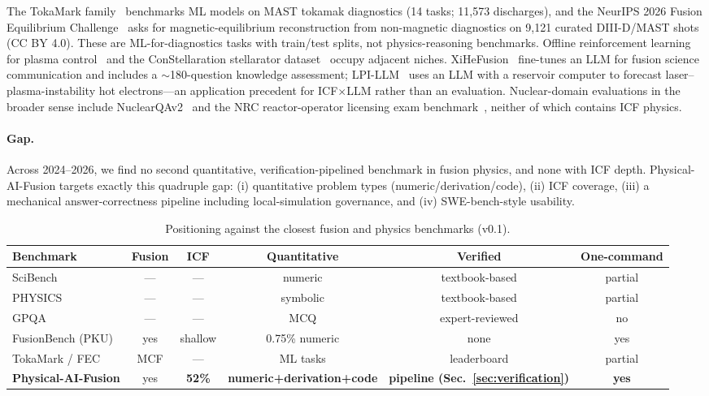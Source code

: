 The TokaMark family~\cite{ibm2026tokamark,gupta2026tokamark} benchmarks ML models on MAST tokamak diagnostics (14 tasks; 11{,}573 discharges), and the NeurIPS 2026 Fusion Equilibrium Challenge~\cite{sophelio2026fec} asks for magnetic-equilibrium reconstruction from non-magnetic diagnostics on 9{,}121 curated DIII-D/MAST shots (CC BY 4.0). These are ML-for-diagnostics tasks with train/test splits, not physics-reasoning benchmarks. Offline reinforcement learning for plasma control~\cite{offlinerl2026fusion} and the ConStellaration stellarator dataset~\cite{constellaration} occupy adjacent niches. XiHeFusion~\cite{wang2025xihefusion} fine-tunes an LLM for fusion science communication and includes a $\sim$180-question knowledge assessment; LPI-LLM~\cite{chen2024lpillm} uses an LLM with a reservoir computer to forecast laser--plasma-instability hot electrons---an application precedent for ICF$\times$LLM rather than an evaluation. Nuclear-domain evaluations in the broader sense include NuclearQAv2~\cite{nuclearqav2} and the NRC reactor-operator licensing exam benchmark~\cite{nrc2026exam}, neither of which contains ICF physics.

\paragraph{Gap.} Across 2024--2026, we find no second quantitative, verification-pipelined benchmark in fusion physics, and none with ICF depth. Physical-AI-Fusion targets exactly this quadruple gap: (i) quantitative problem types (numeric/derivation/code), (ii) ICF coverage, (iii) a mechanical answer-correctness pipeline including local-simulation governance, and (iv) SWE-bench-style usability.

\begin{table}[t]
\centering
\caption{Positioning against the closest fusion and physics benchmarks (v0.1).}
\label{tab:comparison}
\small
\begin{tabular}{@{}lccccc@{}}
\toprule
Benchmark & Fusion & ICF & Quantitative & Verified & One-command \\
\midrule
SciBench & --- & --- & numeric & textbook-based & partial \\
PHYSICS & --- & --- & symbolic & textbook-based & partial \\
GPQA & --- & --- & MCQ & expert-reviewed & no \\
FusionBench (PKU) & yes & shallow & 0.75\% numeric & none & yes \\
TokaMark / FEC & MCF & --- & ML tasks & leaderboard & partial \\
\textbf{Physical-AI-Fusion} & yes & \textbf{52\%} & \textbf{numeric+derivation+code} & \textbf{pipeline (Sec.~\ref{sec:verification})} & \textbf{yes} \\
\bottomrule
\end{tabular}
\end{table}
